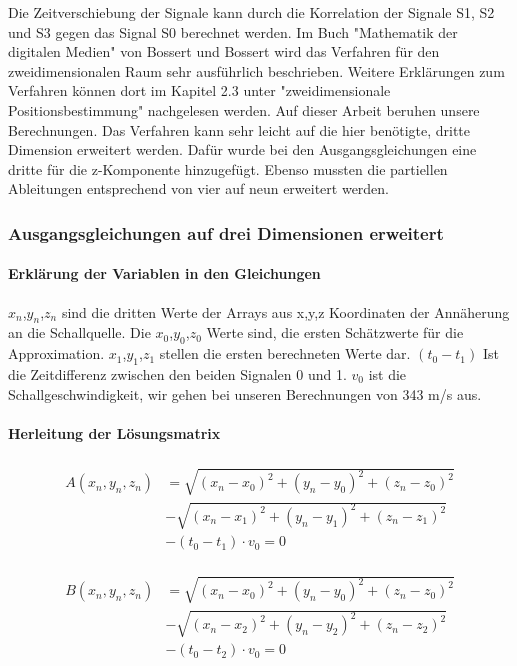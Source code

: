 Die Zeitverschiebung der Signale kann durch die Korrelation der Signale S1, S2 und S3 gegen das Signal S0 berechnet werden. Im Buch "Mathematik der digitalen Medien" von Bossert und Bossert wird das Verfahren für den zweidimensionalen Raum sehr ausführlich beschrieben. Weitere Erklärungen zum Verfahren können dort im Kapitel 2.3 unter "zweidimensionale Positionsbestimmung" nachgelesen werden. Auf dieser Arbeit beruhen unsere Berechnungen. Das Verfahren kann sehr leicht auf die hier benötigte, dritte Dimension erweitert werden. Dafür wurde bei den Ausgangsgleichungen eine dritte für die z-Komponente hinzugefügt. Ebenso mussten die partiellen Ableitungen entsprechend von vier auf neun erweitert werden. 
\subsubsection{Ausgangsgleichungen auf drei Dimensionen erweitert}
\paragraph{Erklärung der Variablen in den Gleichungen}
$x_{n}$,$y_{n}$,$z_{n}$ sind die dritten Werte der Arrays aus x,y,z Koordinaten der Annäherung an die Schallquelle. Die  $x_{0}$,$y_{0}$,$z_{0}$ Werte sind, die ersten Schätzwerte für die Approximation. $x_{1}$,$y_{1}$,$z_{1}$  stellen die ersten berechneten Werte dar. $(t_{0} - t_{1})$ Ist die Zeitdifferenz zwischen den beiden Signalen 0 und 1. $v_{0}$ ist die Schallgeschwindigkeit, wir gehen bei unseren Berechnungen von 343 m/s aus.
\paragraph{Herleitung der Lösungsmatrix} 
\begin{align}
\begin{split}
A(x_{n},y_{n},z_{n})  &=  \sqrt{(x_{n}- x_{0})^{2} + (y_{n} - y_{0})^{2} + (z_{n} - z_{0})^{2}} \\& - \sqrt{(x_{n}- x_{1})^{2} + (y_{n} - y_{1})^{2} + (z_{n} - z_{1})^{2}} \\ & - (t_{0} - t_{1}) \cdot v_{0} = 0\label{Gleichung1}
\end{split}
\end{align}

\begin{align}
\begin{split}
B(x_{n},y_{n},z_{n})  &=  \sqrt{(x_{n}- x_{0})^{2} + (y_{n} - y_{0})^{2} + (z_{n} - z_{0})^{2}} \\& - \sqrt{(x_{n}- x_{2})^{2} + (y_{n} - y_{2})^{2} + (z_{n} - z_{2})^{2}} \\ & - (t_{0} - t_{2}) \cdot v_{0} = 0
\end{split}
\end{align}

